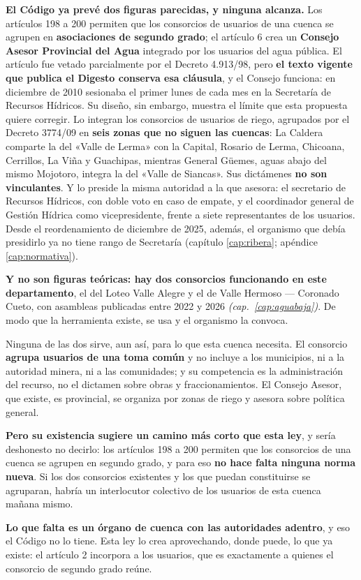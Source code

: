 \begin{cautela}
\textbf{El Código ya prevé dos figuras parecidas, y ninguna alcanza.} Los artículos 198 a 200
permiten que los consorcios de usuarios de una cuenca se agrupen en \textbf{asociaciones de
segundo grado}; el artículo 6 crea un \textbf{Consejo Asesor Provincial del Agua} integrado por los usuarios del agua pública. El artículo fue vetado parcialmente por el Decreto 4.913/98, pero \textbf{el texto vigente que publica el Digesto conserva esa cláusula}, y el Consejo funciona: en diciembre de 2010 sesionaba el primer lunes de cada mes en la Secretaría de Recursos Hídricos. Su diseño, sin embargo, muestra el límite que esta propuesta quiere corregir. Lo integran los consorcios de usuarios de riego, agrupados por el Decreto 3774/09 en \textbf{seis zonas que no siguen las cuencas}: La Caldera comparte la del «Valle de Lerma» con la Capital, Rosario de Lerma, Chicoana, Cerrillos, La Viña y Guachipas, mientras General Güemes, aguas abajo del mismo Mojotoro, integra la del «Valle de Siancas». Sus dictámenes \textbf{no son vinculantes}. Y lo preside la misma autoridad a la que asesora: el secretario de Recursos Hídricos, con doble voto en caso de empate, y el coordinador general de Gestión Hídrica como vicepresidente, frente a siete representantes de los usuarios. Desde el reordenamiento de diciembre de 2025, además, el organismo que debía presidirlo ya no tiene rango de Secretaría (capítulo \ref{cap:ribera}; apéndice \ref{cap:normativa}).

\textbf{Y no son figuras teóricas: hay dos consorcios funcionando en este departamento}, el
del Loteo Valle Alegre y el de Valle Hermoso --- Coronado Cueto, con asambleas publicadas entre
2022 y 2026 \textit{(cap.\ \ref{cap:aguabaja})}. De modo que la herramienta existe, se usa y el
organismo la convoca.

Ninguna de las dos sirve, aun así, para lo que esta cuenca necesita. El consorcio
\textbf{agrupa usuarios de una toma común} y no incluye a los municipios, ni a la autoridad
minera, ni a las comunidades; y su competencia es la administración del recurso, no el dictamen
sobre obras y fraccionamientos. El Consejo Asesor, que existe, es provincial, se organiza por zonas de riego y asesora sobre política general.

\textbf{Pero su existencia sugiere un camino más corto que esta ley}, y sería deshonesto no
decirlo: los artículos 198 a 200 permiten que los consorcios de una cuenca se agrupen en
segundo grado, y para eso \textbf{no hace falta ninguna norma nueva}. Si los dos consorcios
existentes y los que puedan constituirse se agruparan, habría un interlocutor colectivo de los
usuarios de esta cuenca mañana mismo.

\textbf{Lo que falta es un órgano de cuenca con las autoridades adentro}, y eso el Código no lo
tiene. Esta ley lo crea aprovechando, donde puede, lo que ya existe: el artículo 2 incorpora a
los usuarios, que es exactamente a quienes el consorcio de segundo grado reúne.
\end{cautela}

